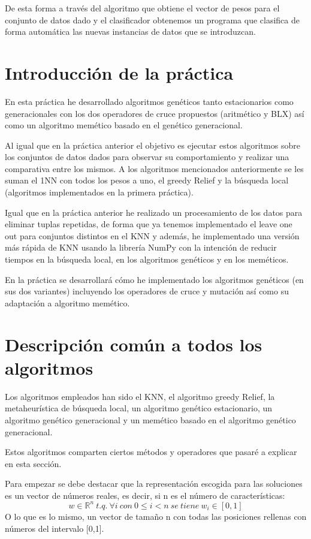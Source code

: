 \documentclass[12pt,a4paper]{article}
\begin{document}
	De esta forma a través del algoritmo que obtiene el vector de pesos para el conjunto de datos dado y el clasificador obtenemos un programa que clasifica de forma automática las nuevas instancias de datos que se introduzcan.


	\section{Introducción de la práctica}
	\label{sec:introPractica}
	
	En esta práctica he desarrollado algoritmos genéticos tanto estacionarios como generacionales con los dos operadores de cruce propuestos (aritmético y BLX) así como un algoritmo memético basado en el genético generacional.
	
	Al igual que en la práctica anterior el objetivo es ejecutar estos algoritmos sobre los conjuntos de datos dados para observar su comportamiento y realizar una comparativa entre los mismos. A los algoritmos mencionados anteriormente se les suman el 1NN con todos los pesos a uno, el greedy Relief y la búsqueda local (algoritmos implementados en la primera práctica).
	
	Igual que en la práctica anterior he realizado un procesamiento de los datos para eliminar tuplas repetidas, de forma que ya tenemos implementado el leave one out para conjuntos distintos en el KNN y además, he implementado una versión más rápida de KNN usando la librería NumPy con la intención de reducir tiempos en la búsqueda local, en los algoritmos genéticos y en los meméticos.
	
	En la práctica se desarrollará cómo he implementado los algoritmos genéticos (en sus dos variantes) incluyendo los operadores de cruce y mutación así como su adaptación a algoritmo memético.
	
	\newpage
	
	\section{Descripción común a todos los algoritmos}
	
	Los algoritmos empleados han sido el KNN, el algoritmo greedy Relief, la metaheurística de búsqueda local, un algoritmo genético estacionario, un algoritmo genético generacional y un memético basado en el algoritmo genético generacional.
	
	Estos algoritmos comparten ciertos métodos y operadores que pasaré a explicar en esta sección.
	
	Para empezar se debe destacar que la representación escogida para las soluciones es un vector de números reales, es decir, si n es el número de características:
	$$w\in \mathbb{R}^n \ t.q. \ \forall i \ con \ 0\leq i < n \ se \ tiene \ w_i \in [0,1]$$
	O lo que es lo mismo, un vector de tamaño n con todas las posiciones rellenas con números del intervalo [0,1].
	
\end{document}
